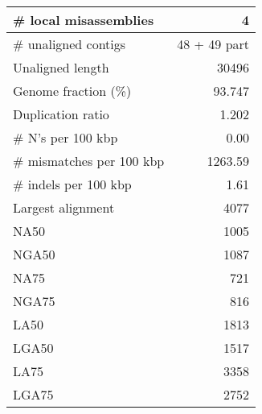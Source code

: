 \documentclass[12pt,a4paper]{article}
\begin{document}
\begin{table}[ht]
\begin{center}
\begin{tabular}{|l*{1}{|r}|}
\# local misassemblies & 4 \\ \hline
\# unaligned contigs & 48 + 49 part \\ \hline
Unaligned length & 30496 \\ \hline
Genome fraction (\%) & 93.747 \\ \hline
Duplication ratio & 1.202 \\ \hline
\# N's per 100 kbp & 0.00 \\ \hline
\# mismatches per 100 kbp & 1263.59 \\ \hline
\# indels per 100 kbp & 1.61 \\ \hline
Largest alignment & 4077 \\ \hline
NA50 & 1005 \\ \hline
NGA50 & 1087 \\ \hline
NA75 & 721 \\ \hline
NGA75 & 816 \\ \hline
LA50 & 1813 \\ \hline
LGA50 & 1517 \\ \hline
LA75 & 3358 \\ \hline
LGA75 & 2752 \\ \hline
\end{tabular}
\end{center}
\end{table}
\end{document}
